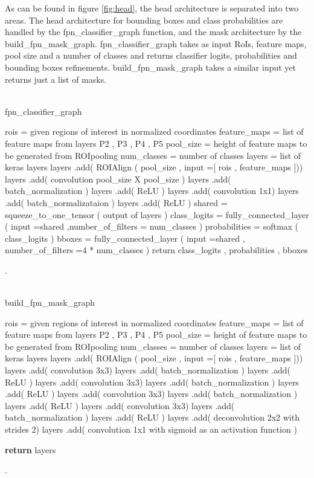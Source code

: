 As can be found in figure \ref{fig:head}, the head architecture is separated into two areas. The head architecture for bounding boxes and class probabilities are handled by the fpn\_classifier\_graph function, and the mask architecture by the build\_fpn\_mask\_graph. 
fpn\_classifier\_graph takes as input RoIs, feature maps, pool size and a number of classes and returns classifier logits, probabilities and bounding boxes refinements. build\_fpn\_mask\_graph takes a similar input yet returns just a list of masks.
\\
\\
\begin{algorithm}[H]\label{alg:6}
  \caption{fpn\_classifier\_graph}
  \SetAlgoLined
  \DontPrintSemicolon
  rois = given regions of interest in normalized coordinates\;
  feature\_maps = list of feature maps from layers P2 , P3 , P4 , P5\;
   pool\_size = height of feature maps to be generated from ROIpooling\;
  num\_classes = number of classes\;
  layers = list of keras layers\;
  layers .add( ROIAlign ( pool\_size , input =[ rois , feature\_maps ]))\;
   layers .add( convolution pool\_size X pool\_size )\;
   layers .add( batch\_normalization )\;
   layers .add( ReLU )\;
   layers .add( convolution 1x1)\;
   layers .add( batch\_normalizataion )\;
   layers .add( ReLU )\;
   shared = squeeze\_to\_one\_tensor ( output of layers )\;
   class\_logits = fully\_connected\_layer ( input =shared ,number\_of\_filters = num\_classes )\;
   probabilities = softmax ( class\_logits )\;
   bboxes = fully\_connected\_layer ( input =shared , number\_of\_filters =4 * num\_classes )\;
   return class\_logits , probabilities , bboxes\;
  
  
\end{algorithm}
.\\
\\
\begin{algorithm}[H] \label{alg:7}
  \caption{build\_fpn\_mask\_graph}
  \SetAlgoLined
  \DontPrintSemicolon
   rois = given regions of interest in normalized coordinates\;
   feature\_maps = list of feature maps from layers P2 , P3 , P4 , P5\;
   pool\_size = height of feature maps to be generated from ROIpooling\;
   num\_classes = number of classes\;
   layers = list of keras layers\;
   layers .add( ROIAlign ( pool\_size , input =[ rois , feature\_maps ]))\;
   layers .add( convolution 3x3)\;
   layers .add( batch\_normalization )\;
   layers .add( ReLU )\;
   layers .add( convolution 3x3)\;
   layers .add( batch\_normalization )\;
   layers .add( ReLU )\;
   layers .add( convolution 3x3)\;
   layers .add( batch\_normalization )\;
   layers .add( ReLU )\;
   layers .add( convolution 3x3)\;
   layers .add( batch\_normalization )\;
   layers .add( ReLU )\;
   layers .add( deconvolution 2x2 with strides 2)\;
   layers .add( convolution 1x1 with sigmoid as an activation function )\;
  
   \textbf{return} layers
\end{algorithm}
.\\
\\

